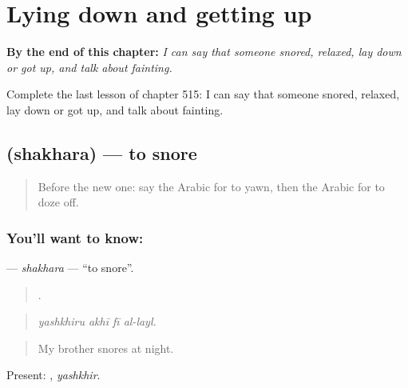 
\chapter{Lying down and getting up}
\label{ch:ar-lying-down-and-getting-up}

\begin{chapteropening}
\textbf{By the end of this chapter:} \emph{I can say that someone snored, relaxed, lay down or got up, and talk about fainting.}

Complete the last lesson of chapter 515: I can say that someone snored, relaxed, lay down or got up, and talk about fainting.
\end{chapteropening}

\section[\texorpdfstring{\ar{شخر} (shakhara)}{شخر (shakhara)}]{ (shakhara) — to snore}

\label{lesson:AR-C515-shakhara}



\begin{quote}
Before the new one: say the Arabic for to yawn, then the Arabic for to doze off.
\end{quote}

\subsection*{You'll want to know: }
\textbf{} — \emph{shakhara} — \textquotedblleft{}to snore\textquotedblright{}.

\begin{quote}
   .
\end{quote}

\begin{quote}
\emph{yashkhiru akhī fī al-layl.}
\end{quote}

\begin{quote}
My brother snores at night.
\end{quote}

Present: , \emph{yashkhir}.

